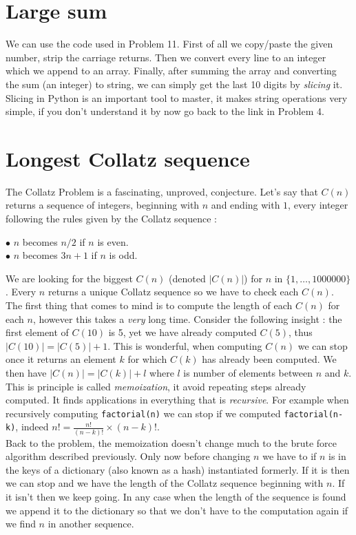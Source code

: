 \documentclass[11pt]{article}
\begin{document}
\section{Large sum}
We can use the code used in Problem 11. First of all we copy/paste the given number, strip the carriage returns. Then we convert every line to an integer which we append to an array. Finally, after summing the array and converting the sum (an integer) to string, we can simply get the last 10 digits by \emph{slicing} it. Slicing in Python is an important tool to master, it makes string operations very simple, if you don't understand it by now go back to the link in Problem 4.

\section{Longest Collatz sequence} 
The Collatz Problem is a fascinating, unproved, conjecture. Let's say that $C(n)$ returns a sequence of integers, beginning with $n$ and ending with $1$, every integer following the rules given by the Collatz sequence :
\begin{center}
$\bullet$ $n$ becomes $n/2$ if $n$ is even.
\\$\bullet$ $n$ becomes $3n+1$ if $n$ is odd.
\end{center}
We are looking for the biggest $C(n)$ (denoted $|C(n)|$) for $n$ in $\{1,\dots,1000000\}$. Every $n$ returns a unique Collatz sequence so we have to check each $C(n)$. The first thing that comes to mind is to compute the length of each $C(n)$ for each $n$, however this takes a \emph{very} long time. Consider the following insight : the first element of $C(10)$ is 5, yet we have already computed $C(5)$, thus $|C(10)|=|C(5)|+1$. This is wonderful, when computing $C(n)$ we can stop once it returns an element $k$ for which $C(k)$ has already been computed. We then have $|C(n)|=|C(k)|+l$ where $l$ is number of elements between $n$ and $k$. This is principle is called \emph{memoization}, it avoid repeating steps already computed. It finds applications in everything that is \emph{recursive}. For example when recursively computing \texttt{factorial(n)} we can stop if we computed \texttt{factorial(n-k)}, indeed $n!=\frac{n!}{(n-k)!} \times (n-k)!$.
\\ Back to the problem, the memoization doesn't change much to the brute force algorithm described previously. Only now before changing $n$ we have to if $n$ is in the keys of a dictionary (also known as a hash) instantiated formerly. If it is then we can stop and we have the length of the Collatz sequence beginning with $n$. If it isn't then we keep going. In any case when the length of the sequence is found we append it to the dictionary so that we don't have to the computation again if we find $n$ in another sequence.
\end{document}
